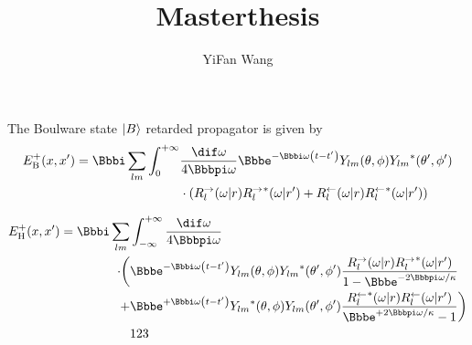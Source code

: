\documentclass[a4paper]{article}
\title{Masterthesis}
\author{YiFan Wang}
\begin{document}
\begin{nameddef}{The Boulware state}
$\Ket{B}$ retarded propagator is given by
\begin{equation}
\begin{split}
\rfun{E_\text{B}^+}{x, x'} = \ii\sum_{lm}\int_0^{+\infty}
&\frac{\dif\omega}{4\pp\omega}\ee^{-\ii\omega\rbr{t-t'}}
\rfun{Y_{lm}}{\theta,\phi}\rfun{{Y_{lm}}^*}{\theta ',\phi '} \\
&\cdot\rbr{\rfun{R_l^{\rightarrow}}{\omega\middle| r}
\rfun{{R_l^{\rightarrow}}^*}{\omega\middle| r'} + 
\rfun{R_l^{\leftarrow}}{\omega\middle| r}
\rfun{{R_l^{\leftarrow}}^*}{\omega\middle| r'}}
\end{split}
\end{equation}
\label{nmd:boulware_state}
\end{nameddef}

\begin{equation}
\begin{split}
\rfun{E_\text{H}^+}{x, x'} =
 \ii \sum_{lm} & \int_{-\infty}^{+\infty}\frac{\dif\omega}{4\pp\omega} \\
\cdot\biggl( & \ee^{-\ii\omega\rbr{t-t'}}
\rfun{Y_{lm}}{\theta,\phi}\rfun{{Y_{lm}}^*}{\theta ',\phi '}
\frac{\rfun{R_l^{\rightarrow}}{\omega\middle| r}
\rfun{{R_l^{\rightarrow}}^*}{\omega\middle| r'}}{1-\ee^{-2\pp\omega/\kappa}}
\\
+ & \ee^{+\ii\omega\rbr{t-t'}}
\rfun{{Y_{lm}}^*}{\theta,\phi}\rfun{Y_{lm}}{\theta ',\phi '}
\frac{\rfun{{R_l^{\leftarrow}}^*}{\omega\middle| r}
\rfun{R_l^{\leftarrow}}{\omega\middle| r'}}{\ee^{+2\pp\omega/\kappa}-1}
\biggr) \\
& 123
\end{split}
\end{equation}
\end{document}
